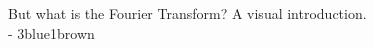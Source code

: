 \documentclass[preview]{standalone}
\begin{document}
\begin{center}
But what is the Fourier Transform? A visual introduction.\\- 3blue1brown
\end{center}
\end{document}
